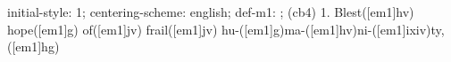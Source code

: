 initial-style: 1;
centering-scheme: english;
def-m1: \grealign;
(cb4) 1. Blest([em1]hv) hope([em1]g) of([em1]jv) frail([em1]jv) hu-([em1]g)ma-([em1]hv)ni-([em1]ixiv)ty,([em1]hg)